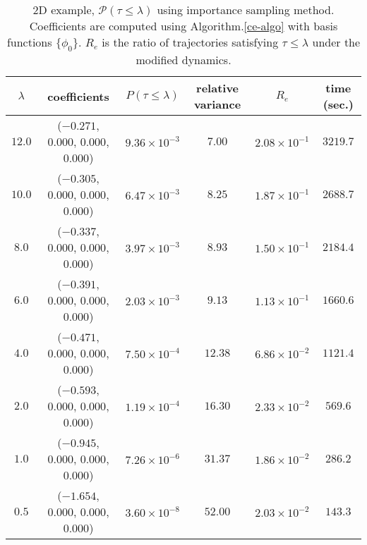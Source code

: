\documentclass[final]{siamltex}
\begin{document}
\begin{table}
  \begin{tabular}{c|c|c|c|c|c}
    \hline
  $\lambda$ & coefficients & $P(\tau \le \lambda)$ & relative variance & $R_e$ & time (sec.) \\
    \hline
    $12.0$ & ($-0.271$, $0.000$, $0.000$, $0.000$) & $9.36\times 10^{-3}$ & $7.00$ & $2.08\times 10^{-1}$ & $3219.7$ \\ 
    \hline
    $10.0$ & ($-0.305$, $0.000$, $0.000$, $0.000$) & $6.47\times 10^{-3}$ & $8.25$ & $1.87\times 10^{-1}$ & $2688.7$ \\
    \hline
    $8.0$ & ($-0.337$, $0.000$, $0.000$, $0.000$) & $3.97\times 10^{-3}$ & $8.93$ & $1.50\times 10^{-1}$ & $2184.4$ \\
    \hline
    $6.0$ & ($-0.391$, $0.000$, $0.000$, $0.000$) & $2.03\times 10^{-3}$ & $9.13$ & $1.13\times 10^{-1}$ & $1660.6$ \\
    \hline
    $4.0$ & ($-0.471$, $0.000$, $0.000$, $0.000$) & $7.50\times 10^{-4}$ & $12.38$ & $6.86\times 10^{-2}$ & $1121.4$ \\
    \hline
    $2.0$ & ($-0.593$, $0.000$, $0.000$, $0.000$) & $1.19\times 10^{-4}$ & $16.30$ & $2.33\times 10^{-2}$ & $569.6$ \\
    \hline
    $1.0$ & ($-0.945$, $0.000$, $0.000$, $0.000$) & $7.26\times 10^{-6}$ & $31.37$ & $1.86\times 10^{-2}$ & $286.2$ \\
    \hline
    $0.5$ & ($-1.654$, $0.000$, $0.000$, $0.000$) & $3.60\times 10^{-8}$ & $52.00$ & $2.03\times 10^{-2}$ & $143.3$ \\
    \hline
  \end{tabular}
  \centering
  \caption{2D example, $\mathcal{P}(\tau \le \lambda)$ using importance
  sampling method. Coefficients are computed using Algorithm.\ref{ce-algo}
with basis functions $\{\phi_0\}$. $R_e$ is the ratio of trajectories
satisfying $\tau \le \lambda$ under the modified dynamics. \label{tab-ex2-2}}
\end{table}
\end{document}
